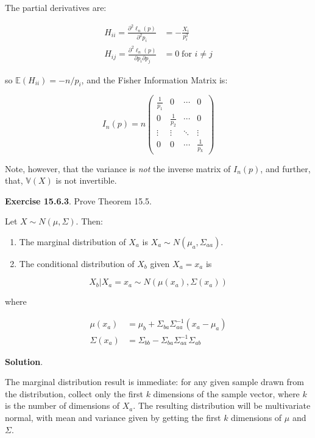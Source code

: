 The partial derivatives are:

\begin{align}
H_{ii} = \frac{\partial^2 \ell_n(p)}{\partial^2 p_i} &= -\frac{X_i}{p_i^2} \\
H_{ij} = \frac{\partial^2 \ell_n(p)}{\partial p_i \partial p_j} &= 0 \; \text{for } i \neq j
\end{align}

so \(\mathbb{E}(H_{ii}) = - n/p_i\), and the Fisher Information Matrix
is:

\[I_n(p) = n \begin{pmatrix}
\frac{1}{p_1} & 0 & \cdots & 0 \\
0 & \frac{1}{p_2} & \cdots & 0 \\
\vdots & \vdots & \ddots & \vdots \\
0 & 0 & \cdots & \frac{1}{p_k}
\end{pmatrix}\]

Note, however, that the variance is \emph{not} the inverse matrix of
\(I_n(p)\), and further, that, \(\mathbb{V}(X)\) is not invertible.

\textbf{Exercise 15.6.3}. Prove Theorem 15.5.

Let \(X \sim N(\mu, \Sigma)\). Then:

\begin{enumerate}[tightlist,label={\arabic*.}]
\item
  The marginal distribution of \(X_a\) is
  \(X_a \sim N(\mu_a, \Sigma_{aa})\).
\item
  The conditional distribution of \(X_b\) given \(X_a = x_a\) is
\end{enumerate}

\[ X_b | X_a = x_a \sim N(\mu(x_a), \Sigma(x_a))\]

where

\begin{align}
\mu(x_a) &= \mu_b + \Sigma_{ba} \Sigma_{aa}^{-1} (x_a - \mu_a) \\
\Sigma(x_a) &= \Sigma_{bb} - \Sigma_{ba}\Sigma_{aa}^{-1}\Sigma_{ab}
\end{align}

\textbf{Solution}.

The marginal distribution result is immediate: for any given sample
drawn from the distribution, collect only the first \(k\) dimensions of
the sample vector, where \(k\) is the number of dimensions of \(X_a\).
The resulting distribution will be multivariate normal, with mean and
variance given by getting the first \(k\) dimensions of \(\mu\) and
\(\Sigma\).

